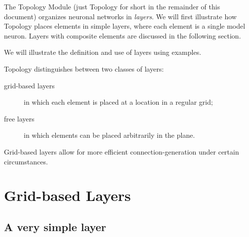 \documentclass[a4paper,12pt]{report}
\begin{document}
The Topology Module (just Topology for short in the remainder of this
document) organizes neuronal networks in \emph{layers}. We will first
illustrate how Topology places elements in simple layers, where each
element is a single model neuron. Layers with composite elements are
discussed in the following section.

We will illustrate the definition and use of layers using examples.

Topology distinguishes between two classes of layers:
\begin{description}
\item[grid-based layers] in which each element is placed at a location in
  a regular grid;
\item[free layers] in which elements can be placed arbitrarily in the plane.
\end{description}
Grid-based layers allow for more efficient connection-generation under
certain circumstances.

\section{Grid-based Layers}\label{sec:gridbased}

\subsection{A very simple layer}\label{sec:verysimple}
\end{document}
